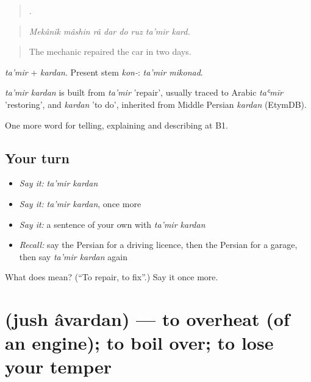 \begin{quote}
       .
\end{quote}

\begin{quote}
\emph{Mekânik mâshin râ dar do ruz ta'mir kard.}
\end{quote}

\begin{quote}
The mechanic repaired the car in two days.
\end{quote}

\emph{ta'mir} + \emph{kardan}. Present stem \emph{kon-}: \emph{ta'mir mikonad}.

\begin{cousinweb}
\emph{ta'mir kardan} is built from \emph{ta'mir} 'repair', usually traced to Arabic \emph{taʿmīr} 'restoring', and \emph{kardan} 'to do', inherited from Middle Persian \emph{kardan} (EtymDB).
\end{cousinweb}

\begin{grammarlens}[title={What you've built}]
One more word for telling, explaining and describing at B1.
\end{grammarlens}

\subsection*{Your turn}
\begin{itemize}
\raggedright
  \item \emph{Say it:} \emph{ta'mir kardan}
  \item \emph{Say it:} \emph{ta'mir kardan}, once more
  \item \emph{Say it:} a sentence of your own with \emph{ta'mir kardan}
  \item \emph{Recall:} say the Persian for a driving licence, then the Persian for a garage, then say \emph{ta'mir kardan} again
\end{itemize}

\begin{tcolorbox}[breakable,colback=teal!4,colframe=teal!35!black,title={Before you move on}]
What does   mean? (\textquotedblleft{}To repair, to fix\textquotedblright{}.) Say it once more.
\end{tcolorbox}
\section[\texorpdfstring{\fa{جوش} \fa{آوردن} (jush âvardan)}{جوش آوردن (jush âvardan)}]{  (jush âvardan) — to overheat (of an engine); to boil over; to lose your temper}

